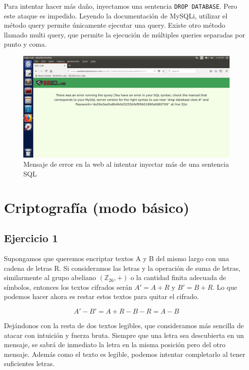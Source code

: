 \documentclass[12pt]{article}
\begin{document}
Para intentar hacer más daño, inyectamos una sentencia \verb|DROP DATABASE|. Pero este ataque es impedido. Leyendo la documentación de MySQLi, utilizar el método query permite únicamente ejecutar una query. Existe otro método llamado multi query, que permite la ejecución de múltiples queries separadas por punto y coma.

\begin{figure}[h!]
    \centering
    \includegraphics[width=0.9\linewidth]{droperror.png}
    \caption{Mensaje de error en la web al intentar inyectar más de una sentencia SQL}
    \label{fig:enter-label}
\end{figure}

\newpage

\section*{Criptografía (modo básico)}

\subsection*{Ejercicio 1}

Supongamos que queremos encriptar textos A y B del mismo largo con una cadena de letras R. Si consideramos las letras y la operación de suma de letras, similarmente al grupo abeliano $(\mathbb{Z}_{26}, +)$ o la cantidad finita adecuada de símbolos, entonces los textos cifrados serán $A' = A + R$ y $B' = B + R$. Lo que podemos hacer ahora es restar estos textos para quitar el cifrado.

$$A' - B' = A + R - B - R = A - B$$

Dejándonos con la resta de dos textos legibles, que consideramos más sencilla de atacar con intuición y fuerza bruta. Siempre que una letra sea descubierta en un mensaje, se sabrá de inmediato la letra en la misma posición pero del otro mensaje. Además como el texto es legible, podemos intentar completarlo al tener suficientes letras.
\end{document}
